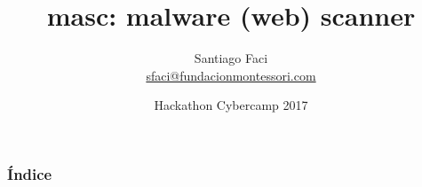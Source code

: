 \documentclass[xcolor={dvipsnames}]{beamer}
\begin{document}
\title{masc: malware (web) scanner}  
\author{Santiago Faci\\ \url{sfaci@fundacionmontessori.com}}
\date{\Large{Hackathon Cybercamp 2017}} 


\begin{frame}
\titlepage
\end{frame}

\begin{frame}\frametitle{Índice}\tableofcontents
\end{frame} 
\end{document}
